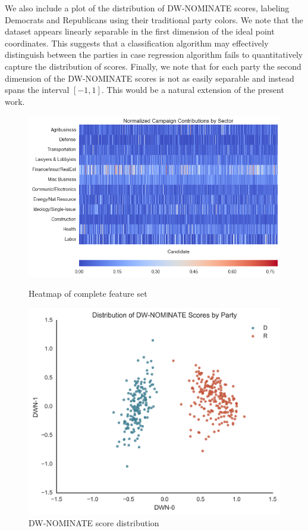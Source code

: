 \documentclass[12]{article}
\begin{document}
\noindent We also include a plot of the distribution of DW-NOMINATE scores, labeling Democrats and Republicans using their traditional party colors. We note that the dataset appears linearly separable in the first dimension of the ideal point coordinates. This suggests that a classification algorithm may effectively distinguish between the parties in case regression algorithm fails to quantitatively capture the distribution of scores. Finally, we note that for each party the second dimension of the DW-NOMINATE scores is not as easily separable and instead spans the interval $\left[-1,1\right]$. This would be a natural extension of the present work.\\

\begin{figure}[H]
  \centering
  \begin{minipage}[b]{0.5\textwidth}
    \includegraphics[width=\textwidth]{cand_2010_2012_2014_fm_trim_normed_feature_hm.png}
    \caption{\label{fig:feature_heatmap}Heatmap of complete feature set}
  \end{minipage}
  \hfill
  \begin{minipage}[b]{0.4\textwidth}
    \includegraphics[width=\textwidth]{dwn.png}
    \caption{\label{fig:dwn}DW-NOMINATE score distribution}
  \end{minipage}
\end{figure}
\end{document}

